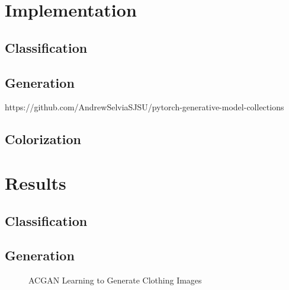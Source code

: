 \documentclass[conference]{IEEEtran}
\begin{document}
    \section{Implementation}\label{sec:implementation}

    \subsection{Classification}\label{subsec:implementation-classification}

    \subsection{Generation}\label{subsec:implementation-generation}

    https://github.com/AndrewSelviaSJSU/pytorch-generative-model-collections

    \subsection{Colorization}\label{subsec:implementation-colorization}

    \section{Results}\label{sec:results}

    \subsection{Classification}\label{subsec:results-classification}

    \subsection{Generation}\label{subsec:results-generation}

    \begin{figure}
        \caption{ACGAN Learning to Generate Clothing Images}
        \label{fig:results1}
        \centering
    \end{figure}
\end{document}
